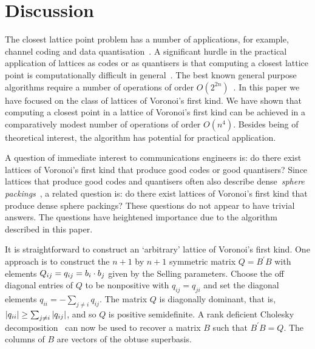 \documentclass[final,leqno]{siamltex}
\begin{document}
\section{Discussion}\label{sec:discussion} 

The closest lattice point problem has a number of applications, for example, channel coding and data quantisation~\cite{Conway1983VoronoiCodes,Conway1982VoronoiRegions,Conway1982FastQuantDec,Erex2004_lattice_decoding,Erez2005}.  A significant hurdle in the practical application of lattices as codes or as quantisers is that computing a closest lattice point is computationally difficult in general~\cite{micciancio_hardness_2001}.  The best known general purpose algorithms require a number of operations of order $O(2^{2n})$~\cite{MicciancioVoulgaris_deterministic_jv_2013}.  In this paper we have focused on the class of lattices of Voronoi's first kind.  We have shown that computing a closest point in a lattice of Voronoi's first kind can be achieved in a comparatively modest number of operations of order $O(n^4)$.  Besides being of theoretical interest, the algorithm has potential for practical application.

A question of immediate interest to communications engineers is: do there exist lattices of Voronoi's first kind that produce good codes or good quantisers?  Since lattices that produce good codes and quantisers often also describe dense~\emph{sphere packings}~\cite{SPLAG}, a related question is: do there exist lattices of Voronoi's first kind that produce dense sphere packings?  These questions do not appear to have trivial answers.  The questions have heightened importance due to the algorithm described in this paper.

It is straightforward to construct an `arbitrary' lattice of Voronoi's first kind.  One approach is to construct the $n+1$ by $n+1$ symmetric matrix $Q = B^\prime B$ with elements $Q_{ij} = q_{ij} = b_{i} \cdot b_j$ given by the Selling parameters.  Choose the off diagonal entries of $Q$ to be nonpositive with $q_{ij}=q_{ji}$ and set the diagonal elements $q_{ii} = -\sum_{j \neq i} q_{ij}$.  %
The matrix $Q$ is diagonally dominant, that is, ${\left| q_{ii} \right|} \geq \sum_{j \neq i} {\left| q_{ij} \right|}$, and so $Q$ is positive semidefinite.  A rank deficient Cholesky decomposition~\cite{Higham90analysisof} can now be used to recover a matrix $B$ such that $B^\prime B  = Q$. The columns of $B$ are vectors of the obtuse superbasis.
\end{document}
